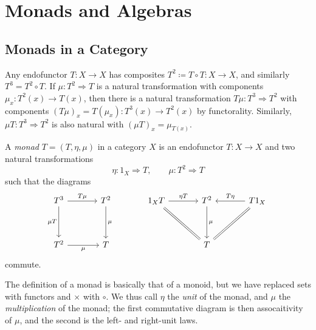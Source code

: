 \chapter{Monads and Algebras}

\section{Monads in a Category}

Any endofunctor $T : X \to X$ has composites $T^2\coloneqq T\circ T : X \to X$, and similarly $T^3=T^2\circ T$. If $\mu : T^2 \Rightarrow T$ is a natural transformation with components $\mu_x : T^2(x) \to T(x)$, then there is a natural transformation $T\mu : T^3 \Rightarrow T^2$ with components $(T\mu)_x =T(\mu_x): T^3(x) \to T^2(x)$ by functorality. Similarly, $\mu T : T^3 \Rightarrow T^2$ is also natural with $(\mu T)_x=\mu_{T(x)}$.

\begin{definition}[Monad]\label{dfn:6.1}
	A \emph{monad} $T=(T,\eta,\mu)$ in a category $X$ is an endofunctor $T : X \to X$ and two natural transformations
	\[
		\eta : 1_X \Rightarrow T,\qquad \mu : T^2 \Rightarrow T
	\]
	such that the diagrams
	\[\begin{tikzcd}[row sep = 3.5em, column sep = 3.5em]
	T^3 \ar[" T\mu ", r] \ar[" \mu T "', d]  & T^2 \ar[" \mu ", d]  & 1_X T \ar[" \eta T ", r] \ar[dr, equals]  & T^2 \ar["\mu  ", d]  & T 1_X \ar[" T\eta "', l] \ar[equals, dl]  \\
	T^2 \ar[" \mu "', r]  & T &  & T & 
	\end{tikzcd}\]
	commute.
\end{definition}

The definition of a monad is basically that of a monoid, but we have replaced sets with functors and $\times $ with $\circ $. We thus call $\eta$ the \emph{unit} of the monad, and $\mu$ the \emph{multiplication} of the monad; the first commutative diagram is then assocaitivity of $\mu$, and the second is the left- and right-unit laws.

